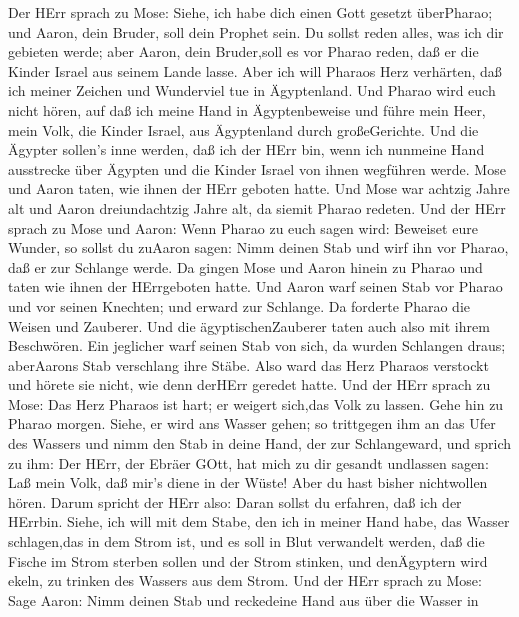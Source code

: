  Der HErr sprach zu Mose: Siehe, ich habe dich einen Gott
gesetzt überPharao; und Aaron, dein Bruder, soll dein Prophet sein.
 Du sollst reden alles, was ich dir gebieten werde; aber
Aaron, dein Bruder,soll es vor Pharao reden, daß er die Kinder Israel
aus seinem Lande lasse.  Aber ich will Pharaos Herz
verhärten, daß ich meiner Zeichen und Wunderviel tue in Ägyptenland.
 Und Pharao wird euch nicht hören, auf daß ich meine Hand in
Ägyptenbeweise und führe mein Heer, mein Volk, die Kinder Israel, aus
Ägyptenland durch großeGerichte.  Und die Ägypter sollen's
inne werden, daß ich der HErr bin, wenn ich nunmeine Hand ausstrecke
über Ägypten und die Kinder Israel von ihnen wegführen werde.
 Mose und Aaron taten, wie ihnen der HErr geboten hatte.
 Und Mose war achtzig Jahre alt und Aaron dreiundachtzig
Jahre alt, da siemit Pharao redeten.  Und der HErr sprach zu
Mose und Aaron:  Wenn Pharao zu euch sagen wird: Beweiset
eure Wunder, so sollst du zuAaron sagen: Nimm deinen Stab und wirf ihn
vor Pharao, daß er zur Schlange werde.  Da gingen Mose und
Aaron hinein zu Pharao und taten wie ihnen der HErrgeboten hatte. Und
Aaron warf seinen Stab vor Pharao und vor seinen Knechten; und erward
zur Schlange.  Da forderte Pharao die Weisen und Zauberer.
Und die ägyptischenZauberer taten auch also mit ihrem Beschwören.
 Ein jeglicher warf seinen Stab von sich, da wurden
Schlangen draus; aberAarons Stab verschlang ihre Stäbe. 
Also ward das Herz Pharaos verstockt und hörete sie nicht, wie denn
derHErr geredet hatte.  Und der HErr sprach zu Mose: Das
Herz Pharaos ist hart; er weigert sich,das Volk zu lassen. 
Gehe hin zu Pharao morgen. Siehe, er wird ans Wasser gehen; so
trittgegen ihm an das Ufer des Wassers und nimm den Stab in deine Hand,
der zur Schlangeward,  und sprich zu ihm: Der HErr, der
Ebräer GOtt, hat mich zu dir gesandt undlassen sagen: Laß mein Volk, daß
mir's diene in der Wüste! Aber du hast bisher nichtwollen hören.
 Darum spricht der HErr also: Daran sollst du erfahren, daß
ich der HErrbin. Siehe, ich will mit dem Stabe, den ich in meiner Hand
habe, das Wasser schlagen,das in dem Strom ist, und es soll in Blut
verwandelt werden,  daß die Fische im Strom sterben sollen
und der Strom stinken, und denÄgyptern wird ekeln, zu trinken des
Wassers aus dem Strom.  Und der HErr sprach zu Mose: Sage
Aaron: Nimm deinen Stab und reckedeine Hand aus über die Wasser in
